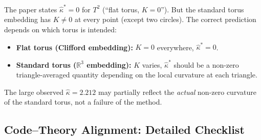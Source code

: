 \documentclass{article}
\begin{document}
\begin{bugbox}
The paper states $\hat{\kappa}^* = 0$ for $T^2$ (``flat torus, $K = 0$'').
But the standard torus embedding has $K \neq 0$ at every point (except two
circles). The correct prediction depends on which torus is intended:
\begin{itemize}
  \item \textbf{Flat torus (Clifford embedding):} $K = 0$ everywhere,
    $\hat{\kappa}^* = 0$.
  \item \textbf{Standard torus ($\mathbb{R}^3$ embedding):}
    $K$ varies, $\hat{\kappa}^*$ should be a non-zero triangle-averaged
    quantity depending on the local curvature at each triangle.
\end{itemize}
The large observed $\hat{\kappa} = 2.212$ may partially reflect the
\textit{actual} non-zero curvature of the standard torus, not a failure
of the method.
\end{bugbox}

\subsection{Code--Theory Alignment: Detailed Checklist}
\end{document}
